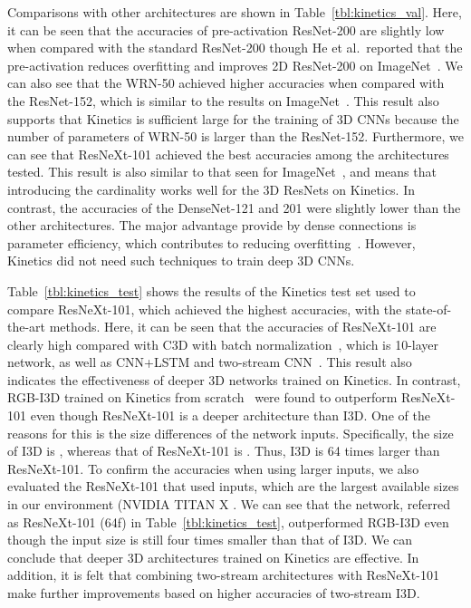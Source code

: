 \documentclass[10pt,twocolumn,letterpaper]{article}
\begin{document}
    Comparisons with other architectures are shown in Table~\ref{tbl:kinetics_val}.
    Here, it can be seen that the accuracies of pre-activation ResNet-200 are slightly low when compared with the standard ResNet-200
    though He et al.\ reported that the pre-activation reduces overfitting and improves 2D ResNet-200 on ImageNet~\cite{He2016}.
    We can also see that the WRN-50 achieved higher accuracies when compared with the ResNet-152,
    which is similar to the results on ImageNet~\cite{WideResNet}.
    This result also supports that Kinetics is sufficient large for the training of 3D CNNs
    because the number of parameters of WRN-50 is larger than the ResNet-152.
    Furthermore, we can see that ResNeXt-101 achieved the best accuracies among the architectures tested.
    This result is also similar to that seen for ImageNet~\cite{resnext},
    and means that introducing the cardinality works well for the 3D ResNets on Kinetics.
    In contrast, the accuracies of the DenseNet-121 and 201 were slightly lower than the other architectures.
    The major advantage provide by dense connections is parameter efficiency,
    which contributes to reducing overfitting~\cite{densenets}.
    However, Kinetics did not need such techniques to train deep 3D CNNs.

    Table~\ref{tbl:kinetics_test} shows the results of the Kinetics test set
    used to compare ResNeXt-101, which achieved the highest accuracies, with the state-of-the-art methods.
    Here, it can be seen that the accuracies of ResNeXt-101 are clearly high
    compared with C3D with batch normalization~\cite{Kinetics}, which is 10-layer network,
    as well as CNN+LSTM and two-stream CNN~\cite{Kinetics}.
    This result also indicates the effectiveness of deeper 3D networks trained on Kinetics.
    In contrast, RGB-I3D trained on Kinetics from scratch~\cite{I3D_arxiv} were found to outperform ResNeXt-101
    even though ResNeXt-101 is a deeper architecture than I3D.
    One of the reasons for this is the size differences of the network inputs.
    Specifically, the size of I3D is ,
    whereas that of ResNeXt-101 is .
    Thus, I3D is 64 times larger than ResNeXt-101.
    To confirm the accuracies when using larger inputs,
    we also evaluated the ResNeXt-101 that used  inputs,
    which are the largest available sizes in our environment (NVIDIA TITAN X .
    We can see that the network, referred as ResNeXt-101 (64f) in Table~\ref{tbl:kinetics_test},
    outperformed RGB-I3D even though the input size is still four times smaller than that of I3D.
    We can conclude that deeper 3D architectures trained on Kinetics are effective.
    In addition, it is felt that combining two-stream architectures with ResNeXt-101 make further improvements
    based on higher accuracies of two-stream I3D.
    
\end{document}
